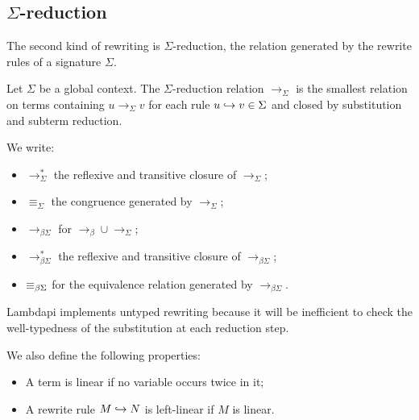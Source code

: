 \subsection{\texorpdfstring{$\Sigma$}{}-reduction}

The second kind of rewriting is $\Sigma$-reduction, the relation generated by the rewrite rules of a signature $\Sigma$.

\begin{definition}
Let $\Sigma$ be a global context. The  $\Sigma$-reduction relation $\longrightarrow_\Sigma$ is the smallest relation on terms containing $u \longrightarrow_\Sigma v$
for each rule $u \hookrightarrow v \in \Sigma$ and closed by substitution and subterm reduction.
\end{definition}

\begin{notation}
We write:

\begin{itemize}
\item $\longrightarrow^*_{\Sigma}$ \index{$\longrightarrow^*_{\Sigma}$} the reflexive and transitive closure of $\longrightarrow_\Sigma$;
\item $\equiv_\Sigma$ \index{$\equiv_\Sigma$} the congruence generated by $\longrightarrow_{\Sigma}$;
\item $\longrightarrow_{\beta\Sigma}$ \index{$\longrightarrow_{\beta\Sigma}$} for $\longrightarrow_{\beta} \cup \longrightarrow_{\Sigma}$;
\item $\longrightarrow^*_{\beta\Sigma}$ \index{$\longrightarrow^*_{\beta\Sigma}$} the reflexive and transitive closure of $\longrightarrow_{\beta\Sigma}$;
\item $\equivL$ \index{$\equivL$} for the equivalence relation generated by $\longrightarrow_{\beta\Sigma}$.
\end{itemize}
\end{notation}

Lambdapi implements untyped rewriting because it will be inefficient to check the well-typedness of the substitution at each reduction step.

\begin{definition}[Linearity]
We also define the following properties:
\begin{itemize}
\item A term is linear if no variable occurs twice in it;
\item A rewrite rule $M \hookrightarrow N$ is left-linear if $M$ is linear.
\end{itemize}
\end{definition}

